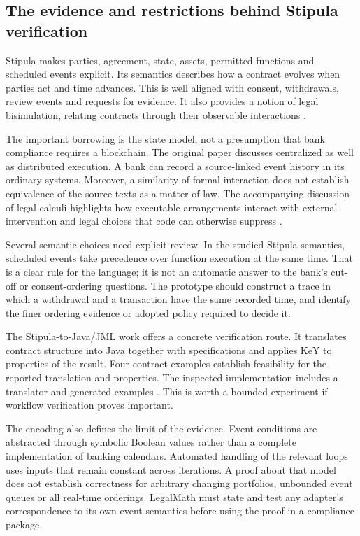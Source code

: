 \documentclass[12pt,a4paper,oneside,openany]{book}
\begin{document}
\subsection{The evidence and restrictions behind Stipula verification}
\label{merge:P-02-literature:05}


Stipula makes parties, agreement, state, assets, permitted functions and scheduled
events explicit. Its semantics describes how a contract evolves when parties act
and time advances. This is well aligned with consent, withdrawals, review events
and requests for evidence. It also provides a notion of legal bisimulation,
relating contracts through their observable interactions
\citep[secs.~3--5]{stipula2021}.

The important borrowing is the state model, not a presumption that bank compliance
requires a blockchain. The original paper discusses centralized as well as
distributed execution. A bank can record a source-linked event history in its
ordinary systems. Moreover, a similarity of formal interaction does not establish
equivalence of the source texts as a matter of law. The accompanying discussion
of legal calculi highlights how executable arrangements interact with external
intervention and legal choices that code can otherwise suppress
\citep{stipula2021,crafa2022}.

Several semantic choices need explicit review. In the studied Stipula semantics,
scheduled events take precedence over function execution at the same time. That
is a clear rule for the language; it is not an automatic answer to the bank's
cut-off or consent-ordering questions. The prototype should construct a trace in
which a withdrawal and a transaction have the same recorded time, and identify
the finer ordering evidence or adopted policy required to decide it.

The Stipula-to-Java/JML work offers a concrete verification route. It translates
contract structure into Java together with specifications and applies KeY to
properties of the result. Four contract examples establish feasibility for the
reported translation and properties. The inspected implementation includes a
translator and generated examples \citep[secs.~3--4 and apps.~A--B]{stipulakey2025,stipulakeycode}.
This is worth a bounded experiment if workflow verification proves important.

The encoding also defines the limit of the evidence. Event conditions are
abstracted through symbolic Boolean values rather than a complete implementation
of banking calendars. Automated handling of the relevant loops uses inputs that
remain constant across iterations. A proof about that model does not establish
correctness for arbitrary changing portfolios, unbounded event queues or all
real-time orderings. LegalMath must state and test any adapter's correspondence
to its own event semantics before using the proof in a compliance package.
\end{document}
